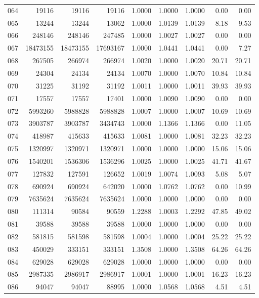 \begin{longtable}{crrrrrrrr}
064 & 19116 & 19116 & 19116 & 1.0000 & 1.0000 & 1.0000 & 0.00 & 0.00 \\
065 & 13244 & 13244 & 13062 & 1.0000 & 1.0139 & 1.0139 & 8.18 & 9.53 \\
066 & 248146 & 248146 & 247485 & 1.0000 & 1.0027 & 1.0027 & 0.00 & 0.00 \\
067 & 18473155 & 18473155 & 17693167 & 1.0000 & 1.0441 & 1.0441 & 0.00 & 7.27 \\
068 & 267505 & 266974 & 266974 & 1.0020 & 1.0000 & 1.0020 & 20.71 & 20.71 \\
069 & 24304 & 24134 & 24134 & 1.0070 & 1.0000 & 1.0070 & 10.84 & 10.84 \\
070 & 31225 & 31192 & 31192 & 1.0011 & 1.0000 & 1.0011 & 39.93 & 39.93 \\
071 & 17557 & 17557 & 17401 & 1.0000 & 1.0090 & 1.0090 & 0.00 & 0.00 \\
072 & 5993260 & 5988828 & 5988828 & 1.0007 & 1.0000 & 1.0007 & 10.69 & 10.69 \\
073 & 3903787 & 3903787 & 3434743 & 1.0000 & 1.1366 & 1.1366 & 0.00 & 11.05 \\
074 & 418987 & 415633 & 415633 & 1.0081 & 1.0000 & 1.0081 & 32.23 & 32.23 \\
075 & 1320997 & 1320971 & 1320971 & 1.0000 & 1.0000 & 1.0000 & 15.06 & 15.06 \\
076 & 1540201 & 1536306 & 1536296 & 1.0025 & 1.0000 & 1.0025 & 41.71 & 41.67 \\
077 & 127832 & 127591 & 126652 & 1.0019 & 1.0074 & 1.0093 & 5.08 & 5.07 \\
078 & 690924 & 690924 & 642020 & 1.0000 & 1.0762 & 1.0762 & 0.00 & 10.99 \\
079 & 7635624 & 7635624 & 7635624 & 1.0000 & 1.0000 & 1.0000 & 0.00 & 0.00 \\
080 & 111314 & 90584 & 90559 & 1.2288 & 1.0003 & 1.2292 & 47.85 & 49.02 \\
081 & 39588 & 39588 & 39588 & 1.0000 & 1.0000 & 1.0000 & 0.00 & 0.00 \\
082 & 581815 & 581598 & 581598 & 1.0004 & 1.0000 & 1.0004 & 25.22 & 25.22 \\
083 & 450029 & 333151 & 333151 & 1.3508 & 1.0000 & 1.3508 & 64.26 & 64.26 \\
084 & 629028 & 629028 & 629028 & 1.0000 & 1.0000 & 1.0000 & 0.00 & 0.00 \\
085 & 2987335 & 2986917 & 2986917 & 1.0001 & 1.0000 & 1.0001 & 16.23 & 16.23 \\
086 & 94047 & 94047 & 88995 & 1.0000 & 1.0568 & 1.0568 & 4.51 & 4.51 \\

\end{longtable}

